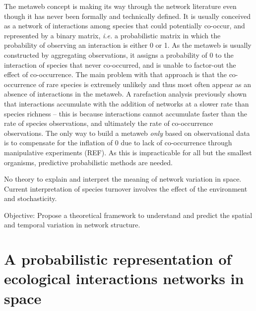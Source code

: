 \documentclass[12pt]{article}
\begin{document}
The metaweb concept is making its way through the network literature even
though it has never been formally and technically defined.
It is usually conceived as a network of interactions among species that
could potentially co-occur, and represented by a binary matrix, \emph{i.e.}
a probabilistic matrix in which the probability of observing an interaction
is either 0 or 1. As the metaweb is usually constructed by aggregating
observations, it assigns a probability of 0 to the interaction of species that
never co-occurred, and is unable to factor-out the effect of co-occurrence. The
main problem with that approach is that the co-occurrence of rare species is
extremely unlikely and thus most often appear as an absence of interactions
in the metaweb. A rarefaction analysis previously shown that interactions
accumulate with the addition of networks at a slower rate than species richness
\parencite{Poisot2012d} -- this is because interactions cannot accumulate
faster than the rate of species observations, and ultimately the rate of
co-occurrence observations. The only way to build a metaweb \emph{only}
based on observational data is to compensate for the inflation of 0 due
to lack of co-occurrence through manipulative experiments (REF). As this is
impracticable for all but the smallest organisms, predictive probabilistic
methods are needed.

No theory to explain and interpret the meaning of network variation in space.
Current interpretation of species turnover involves the effect of the
environment and stochasticity.

Objective: Propose a theoretical framework to understand and predict the
spatial and temporal variation in network structure.

\newpage
\section*{A probabilistic representation of ecological interactions networks in space}

\end{document}
